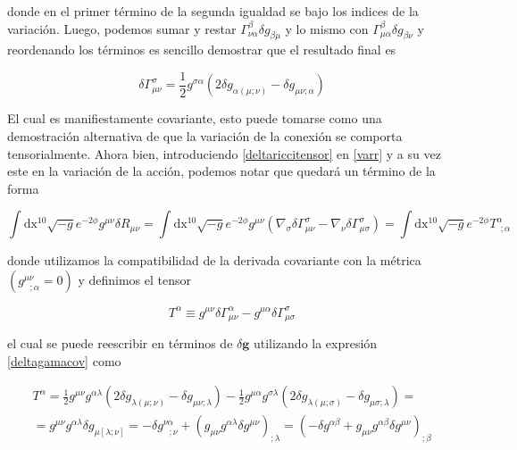 \documentclass{article}
\numberwithin{equation}{section}
\begin{document}
donde en el primer término de la segunda igualdad se bajo los indices de la variación. Luego, podemos sumar y restar $ \Gamma^{\beta}_{\nu \alpha} \delta g_{\beta\mu} $ y lo mismo con $ \Gamma^{\beta}_{\mu \alpha} \delta g_{\beta\nu} $ y reordenando los términos es sencillo demostrar que el resultado final es

\begin{equation}\label{deltagamacov}
\delta \Gamma^{\sigma}_{\mu\nu} = \frac{1}{2}g^{\sigma\alpha}\left(2\delta g_{\alpha \left(\mu ; \nu \right)} - \delta g_{\mu\nu ;\alpha}\right)
\end{equation}

El cual es manifiestamente covariante, esto puede tomarse como una demostración alternativa de que la variación de la conexión se comporta tensorialmente. Ahora bien, introduciendo \ref{deltariccitensor} en \ref{varr} y a su vez este en la variación de la acción, podemos notar que quedará un término de la forma

\begin{equation}\label{aux3}
\int\mathrm{dx^{10}} \sqrt{-g}e^{-2\phi} g^{\mu\nu}\delta R_{\mu\nu} = \int\mathrm{dx^{10}} \sqrt{-g}e^{-2\phi}g^{\mu\nu}\left( \nabla_{\sigma} \delta \Gamma^{\sigma}_{\mu \nu} - \nabla_{\nu} \delta \Gamma^{\sigma}_{\mu \sigma}\right) = \int\mathrm{dx^{10}} \sqrt{-g}e^{-2\phi} T^{\alpha}_{ \ \ ;\alpha} 
\end{equation}

donde utilizamos la compatibilidad de la derivada covariante con la métrica $ \left( g^{\mu\nu}_{ \ \ \ ; \alpha}=0  \right) $ y definimos el tensor 

\begin{equation*}
T^{\alpha} \equiv g^{\mu\nu} \delta \Gamma^{\alpha}_{\mu \nu} -  g^{\mu\alpha} \delta \Gamma^{\sigma}_{\mu \sigma}
\end{equation*}

el cual se puede reescribir en términos de $ \delta\textbf{g} $ utilizando la expresión \ref{deltagamacov} como

\begin{equation*}
\begin{aligned}
T^{\alpha}  = \frac{1}{2} g^{\mu\nu} g^{\alpha\lambda}\left(2\delta g_{\lambda \left(\mu ; \nu \right)} - \delta g_{\mu\nu ;\lambda}\right) - \frac{1}{2}g^{\mu\alpha} g^{\sigma\lambda}\left(2\delta g_{\lambda \left(\mu ; \sigma \right)} - \delta g_{\mu\sigma ;\lambda}\right) = \\
= g^{\mu\nu} g^{\alpha\lambda}\delta g_{\mu \left[ \lambda ; \nu \right]} = - \delta g^{\nu\alpha}_{ \ \ \ ; \nu} + \left( g_{\mu\nu}g^{\alpha\lambda} \delta g^{\mu\nu}\right)_{;\lambda} =  \left( - \delta g^{\alpha\beta} + g_{\mu\nu}g^{\alpha\beta} \delta g^{\mu\nu}\right)_{ ; \beta}
\end{aligned}
\end{equation*}
\end{document}
